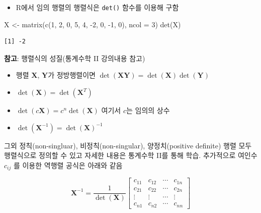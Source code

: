 \documentclass[
  11pt,
]{krantz}
\makeatletter
\newenvironment{Shaded}{\begin{snugshade}}{\end{snugshade}}
\newcommand{\AttributeTok}[1]{\textcolor[rgb]{0.61,0.61,0.61}{#1}}
\newcommand{\DecValTok}[1]{\textcolor[rgb]{0.06,0.06,0.06}{#1}}
\newcommand{\FunctionTok}[1]{\textcolor[rgb]{0,0,0}{#1}}
\newcommand{\NormalTok}[1]{#1}
\newcommand{\OtherTok}[1]{\textcolor[rgb]{0.37,0.37,0.37}{#1}}
\newcommand{\SpecialCharTok}[1]{\textcolor[rgb]{0,0,0}{#1}}
\providecommand{\tightlist}{%
  \setlength{\itemsep}{0pt}\setlength{\parskip}{0pt}}
\newenvironment{kframe}{%
\medskip{}
\setlength{\fboxsep}{.8em}
 \def\at@end@of@kframe{}%
 \ifinner\ifhmode%
  \def\at@end@of@kframe{\end{minipage}}%
  \begin{minipage}{\columnwidth}%
 \fi\fi%
 \def\FrameCommand##1{\hskip\@totalleftmargin \hskip-\fboxsep
 \colorbox{shadecolor}{##1}\hskip-\fboxsep
     \hskip-\linewidth \hskip-\@totalleftmargin \hskip\columnwidth}%
 \MakeFramed {\advance\hsize-\width
   \@totalleftmargin\z@ \linewidth\hsize
   \@setminipage}}%
 {\par\unskip\endMakeFramed%
 \at@end@of@kframe}
\newenvironment{rmdblock}[1]
  {
  \begin{itemize}
  \renewcommand{\labelitemi}{
    \raisebox{-.7\height}[0pt][0pt]{
      {\setkeys{Gin}{width=3em,keepaspectratio}\texttt{[image: images/\#1]}}
    }
  }
  \setlength{\fboxsep}{1em}
  \begin{kframe}
  \item
  }
  {
  \end{kframe}
  \end{itemize}
  }
\newenvironment{rmdtip}
  {\begin{rmdblock}{tip}}
  {\end{rmdblock}}
\makeatother
\begin{document}
\begin{itemize}
\tightlist
\item
  R에서 임의 행렬의 행렬식은 \texttt{det()} 함수를 이용해 구함
\end{itemize}

\footnotesize

\begin{Shaded}
\begin{Highlighting}[]
\NormalTok{X }\OtherTok{\textless{}{-}} \FunctionTok{matrix}\NormalTok{(}\FunctionTok{c}\NormalTok{(}\DecValTok{1}\NormalTok{, }\DecValTok{2}\NormalTok{, }\DecValTok{0}\NormalTok{, }\DecValTok{5}\NormalTok{, }\DecValTok{4}\NormalTok{, }\SpecialCharTok{{-}}\DecValTok{2}\NormalTok{, }\DecValTok{0}\NormalTok{, }\SpecialCharTok{{-}}\DecValTok{1}\NormalTok{, }\DecValTok{0}\NormalTok{), }\AttributeTok{ncol =} \DecValTok{3}\NormalTok{)}
\FunctionTok{det}\NormalTok{(X)}
\end{Highlighting}
\end{Shaded}

\begin{verbatim}
[1] -2
\end{verbatim}

\normalsize

\footnotesize

\begin{rmdtip}
\textbf{참고}: 행렬식의 성질(통계수학 II 강의내용 참고)

\begin{itemize}
\tightlist
\item
  행렬 \(\mathrm{\mathbf{X}}\), \(\mathrm{\mathbf{Y}}\)가 정방행렬이면 \(\det(\mathrm{\mathbf{XY}}) = \det(\mathrm{\mathbf{X}})\det(\mathrm{\mathbf{Y}})\)
\item
  \(\det(\mathrm{\mathbf{X}}) = \det(\mathrm{\mathbf{X}}^T)\)
\item
  \(\det(c\mathrm{\mathbf{X}}) = c^n \det(\mathrm{\mathbf{X}})\) 여기서 \(c\)는 임의의 상수
\item
  \(\det(\mathrm{\mathbf{X}}^{-1}) = \det(\mathrm{\mathbf{X}})^{-1}\)
\end{itemize}

그외 정칙(non-singluar), 비정칙(non-singular), 양정치(positive definite) 행렬 모두 행렬식으로 정의할 수 있고 자세한 내용은 통계수학 II를 통해 학습. 추가적으로 여인수 \(c_{ij}\) 를 이용한 역행렬 공식은 아래와 같음

\[\mathrm{\mathbf{X}}^{-1} = \frac{1}{\det(\mathrm{\mathbf{X}})}
\begin{bmatrix}
c_{11} & c_{12} &  \cdots & c_{1n} \\
c_{21} & c_{22} &  \cdots & c_{2n} \\
\vdots & \vdots & \cdots & \vdots \\
c_{n1} & c_{n2}  & \cdots & c_{nn}
\end{bmatrix}
\]
\end{rmdtip}
\end{document}
